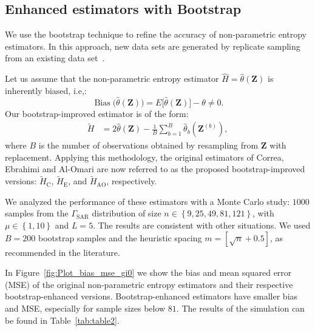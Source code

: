 \documentclass[remotesensing,article,submit,moreauthors,pdftex]{Definitions/mdpi}
\begin{document}
\subsection{Enhanced estimators with
Bootstrap}\label{enhanced-estimators-with-bootstrap}

We use the bootstrap technique to refine the accuracy of non-parametric
entropy estimators. In this approach, new data sets are generated by
replicate sampling from an existing data set~\cite{Michelucci2021}.

Let us assume that the non-parametric entropy estimator
\(\widehat{H}=\widehat{\theta}(\bm{Z})\) is inherently biased, i.e,:
\begin{equation}
\label{Eq:bias1}
\operatorname{Bias}\big(\widehat{\theta}(\bm{Z})\big) = E\big[\widehat{\theta}(\bm{Z})\big] - \theta \neq 0.
\end{equation} Our bootstrap-improved estimator is of the form:
\begin{align*}
\widetilde{H} &= 2\widehat{\theta}(\bm{Z}) - \frac{1}{B}\sum_{b=1}^B \widehat{\theta}_b(\bm{Z}^{(b)}),
\end{align*} where \(B\) is the number of observations obtained by
resampling from \(\bm Z\) with replacement. Applying this methodology,
the original estimators of Correa, Ebrahimi and Al-Omari are now
referred to as the proposed bootstrap-improved versions:
\(\widetilde{H}_{\text{C}}\), \(\widetilde{H}_{\text{E}}\), and
\(\widetilde{H}_{\text{AO}}\), respectively.

We analyzed the performance of these estimators with a Monte Carlo
study: \(1000\) samples from the \(\Gamma_{\text{SAR}}\) distribution of
size \(n\in\left\{9, 25, 49, 81, 121\right\}\), with
\(\mu\in\left\{1, 10\right\}\) and \(L=5\). The results are consistent
with other situations. We used \(B=200\) bootstrap samples and the
heuristic spacing \(m=\left[\sqrt{n}+0.5\right]\), as recommended in the
literature.

In Figure~\ref{fig:Plot_bias_mse_gi0} we show the bias and mean squared
error (MSE) of the original non-parametric entropy estimators and their
respective bootstrap-enhanced versions. Bootstrap-enhanced estimators
have smaller bias and MSE, especially for sample sizes below \(81\). The
results of the simulation can be found in Table~\ref{tab:table2}.
\end{document}
